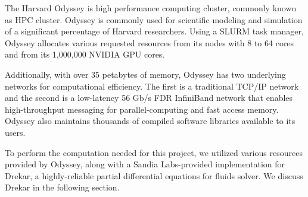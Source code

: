 The Harvard Odyssey is high performance computing cluster, commonly known as HPC cluster. Odyssey is commonly used for scientific modeling and simulation of a significant percentage of Harvard researchers. Using a SLURM task manager, Odyssey allocates various requested resources from its nodes with 8 to 64 cores and from its 1,000,000 NVIDIA GPU cores.

Additionally, with over 35 petabytes of memory, Odyssey has two underlying networks for computational efficiency. The first is a traditional TCP/IP network and the second is a low-latency 56 Gb/s FDR InfiniBand network that enables high-throughput messaging for parallel-computing and fast access memory. Odyssey also maintains thousands of compiled software libraries available to its users. 

To perform the computation needed for this project, we utilized various resources provided by Odyssey, along with a Sandia Labs-provided implementation for Drekar, a highly-reliable partial differential equations for fluids solver. We discuss Drekar in the following section.